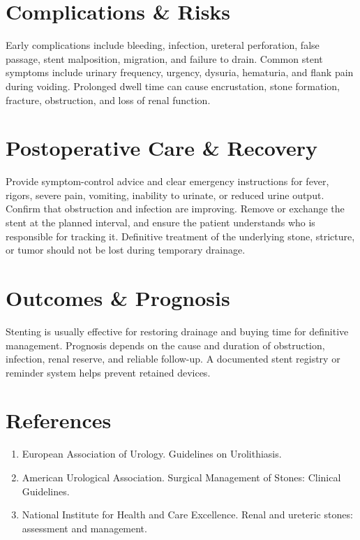 \section*{Complications \& Risks}
Early complications include bleeding, infection, ureteral perforation, false passage, stent malposition, migration, and failure to drain. Common stent symptoms include urinary frequency, urgency, dysuria, hematuria, and flank pain during voiding. Prolonged dwell time can cause encrustation, stone formation, fracture, obstruction, and loss of renal function.

\section*{Postoperative Care \& Recovery}
Provide symptom-control advice and clear emergency instructions for fever, rigors, severe pain, vomiting, inability to urinate, or reduced urine output. Confirm that obstruction and infection are improving. Remove or exchange the stent at the planned interval, and ensure the patient understands who is responsible for tracking it. Definitive treatment of the underlying stone, stricture, or tumor should not be lost during temporary drainage.

\section*{Outcomes \& Prognosis}
Stenting is usually effective for restoring drainage and buying time for definitive management. Prognosis depends on the cause and duration of obstruction, infection, renal reserve, and reliable follow-up. A documented stent registry or reminder system helps prevent retained devices.

\section*{References}
\begin{enumerate}
\item European Association of Urology. Guidelines on Urolithiasis.
\item American Urological Association. Surgical Management of Stones: Clinical Guidelines.
\item National Institute for Health and Care Excellence. Renal and ureteric stones: assessment and management.
\end{enumerate}

